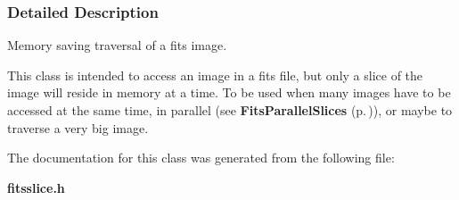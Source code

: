 \subsubsection{Detailed Description}
Memory saving traversal of a fits image.

This class is intended to access an image in a fits file, but only a slice of the image will reside in memory at a time. To be used when many images have to be accessed at the same time, in parallel (see {\bf Fits\-Parallel\-Slices} {\rm (p.\,\pageref{class_fitsparallelslices})}), or maybe to traverse a very big image. 



The documentation for this class was generated from the following file:\begin{CompactItemize}
\item 
{\bf fitsslice.h}\end{CompactItemize}
